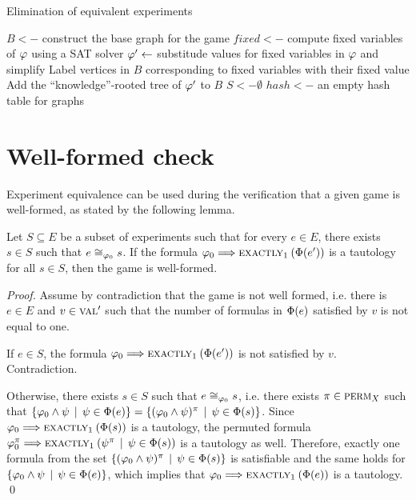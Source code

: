 \begin{algorithm}[!ht]
\caption{Elimination of equivalent experiments}
\label{alg:noneqexp}
\DontPrintSemicolon
$B <-$ construct the base graph for the game\;
$fixed <-$ compute fixed variables of $\varphi$ using a SAT solver\;
$\varphi' <- $ substitude values for fixed variables in $\varphi$ and simplify\;
Label vertices in $B$ corresponding to fixed variables with their fixed value\;
Add the ``knowledge''-rooted tree of $\varphi'$ to $B$\;
$S <- \emptyset$\;
$hash <- $ an empty hash table for graphs\;
\end{algorithm}

\pagebreak
\section{Well-formed check}

Experiment equivalence can be used during the verification
  that a given game is well-formed, as stated by the following lemma.

\begin{lemma} \label{lma:well-formed}
  Let $S\subseteq E$ be a subset of experiments
  such that for every $e\in E$, there exists $s\in S$
   such that $e\cong_{\varphi_0}s$.
  If the formula $\varphi_0 ==> \textsc{exactly}_{1}\:(\Phi(e'))$ is a tautology for
  all $s\in S$, then the game is well-formed.
\end{lemma}

\begin{proof}
Assume by contradiction that the game is not well formed, i.e.
  there is $e\in E$ and $v \in \textsc{val}'$ such that the number of
  formulas in $\Phi(e)$ satisfied by $v$ is not equal to one.

If $e\in S$, the formula $\varphi_0 ==> \textsc{exactly}_{1}\:(\Phi(e'))$ is not
  satisfied by $v$. Contradiction.

Otherwise, there exists $s\in S$ such that $e\cong_{\varphi_0}s$, i.e.
  there exists $\pi\in\textsc{perm}_X$ such that
$\{ \varphi_0\wedge\psi \:\:|\:\: \psi\in\Phi(e) \} =
 \{ (\varphi_0\wedge\psi)^\pi \:\:|\:\: \psi\in\Phi(s) \}$.
Since $\varphi_0 ==> \textsc{exactly}_{1}\:(\Phi(s))$ is a tautology,
  the permuted formula
  $\varphi_0^\pi ==> \textsc{exactly}_{1}\:(\psi^\pi \:\:|\:\: \psi\in\Phi(s))$
  is a tautology as well.
Therefore, exactly one formula from the set
 $ \{ (\varphi_0\wedge\psi)^\pi \:\:|\:\: \psi\in\Phi(s) \}$
 is satisfiable and the same holds for
  $\{ \varphi_0\wedge\psi \:\:|\:\: \psi\in\Phi(e) \}$,
 which implies that
 $\varphi_0 ==> \textsc{exactly}_{1}\:(\Phi(e))$
 is a tautology. \qed
\end{proof}

